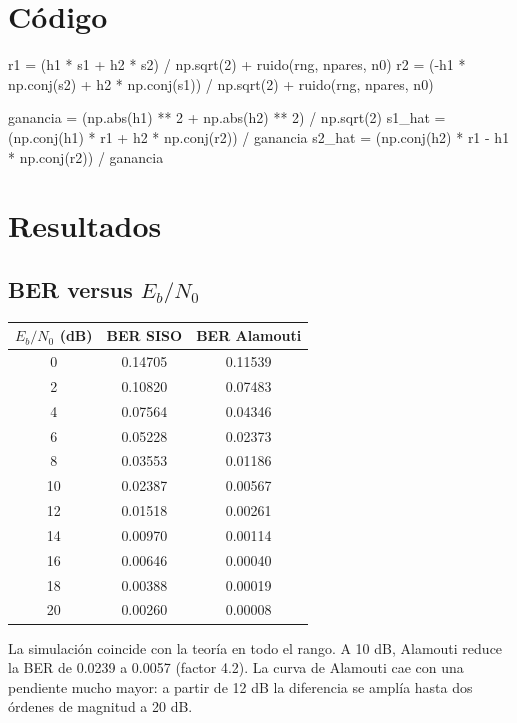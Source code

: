 \documentclass[11pt,a4paper]{article}
\begin{document}
\section{Código}

\begin{codigo}
r1 = (h1 * s1 + h2 * s2) / np.sqrt(2) + ruido(rng, npares, n0)
r2 = (-h1 * np.conj(s2) + h2 * np.conj(s1)) / np.sqrt(2) + ruido(rng, npares, n0)

ganancia = (np.abs(h1) ** 2 + np.abs(h2) ** 2) / np.sqrt(2)
s1_hat = (np.conj(h1) * r1 + h2 * np.conj(r2)) / ganancia
s2_hat = (np.conj(h2) * r1 - h1 * np.conj(r2)) / ganancia
\end{codigo}

\section{Resultados}

\subsection{BER versus $E_b/N_0$}

\begin{tabular}{@{}ccc@{}}
  \toprule
  $E_b/N_0$ (dB) & BER SISO & BER Alamouti \\
  \midrule
  0  & 0.14705 & 0.11539 \\
  2  & 0.10820 & 0.07483 \\
  4  & 0.07564 & 0.04346 \\
  6  & 0.05228 & 0.02373 \\
  8  & 0.03553 & 0.01186 \\
  10 & 0.02387 & 0.00567 \\
  12 & 0.01518 & 0.00261 \\
  14 & 0.00970 & 0.00114 \\
  16 & 0.00646 & 0.00040 \\
  18 & 0.00388 & 0.00019 \\
  20 & 0.00260 & 0.00008 \\
  \bottomrule
\end{tabular}


La simulación coincide con la teoría en todo el rango. A 10 dB, Alamouti reduce la BER de
0.0239 a 0.0057 (factor 4.2). La curva de Alamouti cae con una pendiente mucho mayor: a
partir de 12 dB la diferencia se amplía hasta dos órdenes de magnitud a 20 dB.
\end{document}
